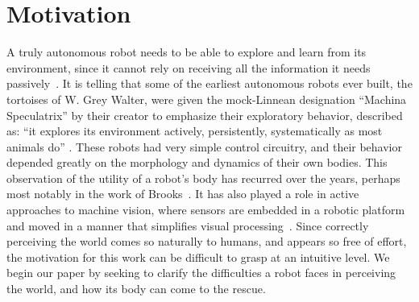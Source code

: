 
\section{Motivation}

A truly autonomous robot needs to be able to explore and learn from
its environment, since it cannot rely on receiving all the information
it needs passively~\cite{whaite97autonomous}.
It is telling that some of the earliest autonomous robots ever built,
the tortoises of W. Grey Walter, were given the mock-Linnean
designation ``Machina Speculatrix'' by their creator to emphasize their exploratory
behavior, described as: ``it explores its environment actively,
persistently, systematically as most animals do''
\cite{walter50imitation}.
These robots had very simple control circuitry, and their behavior
depended greatly on the morphology and dynamics of their own bodies.
%
This observation of the utility of a robot's body has recurred over
the years, perhaps most notably in the work of
Brooks~\cite{group-AAAI-98}.  It has also played a role in active
approaches to machine vision, where sensors are embedded in a robotic
platform and moved in a manner that simplifies visual
processing~\cite{ballard91animate}.
%
Since correctly perceiving the world comes so naturally to humans, and
appears so free of effort, the motivation for this work can be
difficult to grasp at an intuitive level.  We begin our paper by
seeking to clarify the difficulties a robot faces in perceiving the
world, and how its body can come to the rescue.




